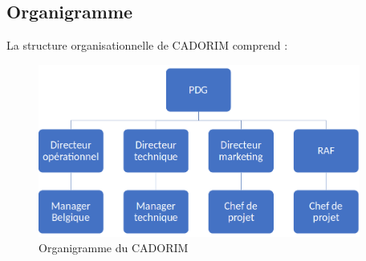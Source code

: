 \subsection{Organigramme}
La structure organisationnelle de CADORIM comprend :
\begin{figure}[h]
	\includegraphics[scale=0.8,width=400px]{./Template LaTeX/Images/og.png}
	\centering
	\caption{Organigramme du CADORIM}
\end{figure}

\newpage
